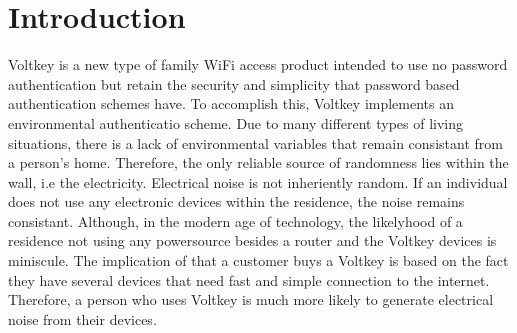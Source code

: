 \section{Introduction}

Voltkey is a new type of family WiFi access product intended to use no password authentication but retain the security and simplicity that password based authentication schemes have.
To accomplish this, Voltkey implements an environmental authenticatio scheme.
Due to many different types of living situations, there is a lack of environmental variables that remain consistant from a person's home.
Therefore, the only reliable source of randomness lies within the wall, i.e the electricity.
Electrical noise is not inheriently random.
If an individual does not use any electronic devices within the residence, the noise remains consistant.
Although, in the modern age of technology, the likelyhood of a residence not using any powersource besides a router and the Voltkey devices is miniscule.
The implication of that a customer buys a Voltkey is based on the fact they have several devices that need fast and simple connection to the internet.
Therefore, a person who uses Voltkey is much more likely to generate electrical noise from their devices. 